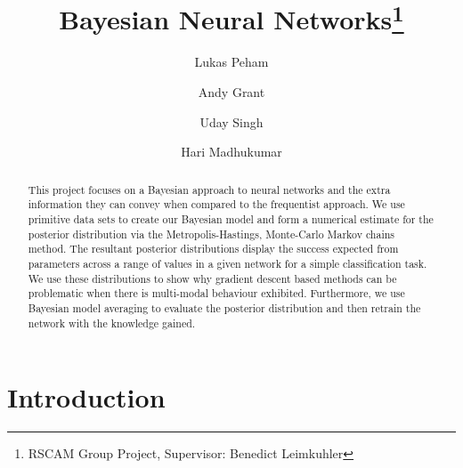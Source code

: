 \documentclass[review]{siamart190516}
\title{Bayesian Neural Networks\thanks{RSCAM Group Project,
Supervisor: Benedict Leimkuhler}}
\author{Lukas Peham
\and Andy Grant
\and Uday Singh
\and Hari Madhukumar
}
\begin{document}
\maketitle

\begin{abstract}
    This project focuses on a Bayesian approach to neural networks and the extra information they can convey when compared to the frequentist approach. We use primitive data sets to create our Bayesian model and form a numerical estimate for the posterior distribution via the Metropolis-Hastings, Monte-Carlo Markov chains method. The resultant posterior distributions display the success expected from parameters across a range of values in a given network for a simple classification task. We use these distributions to show why gradient descent based methods can be problematic when there is multi-modal behaviour exhibited. Furthermore, we use Bayesian model averaging to evaluate the posterior distribution and then retrain the network with the knowledge gained. 

\end{abstract}

\section{Introduction} \label{sec:intro}
\end{document}
